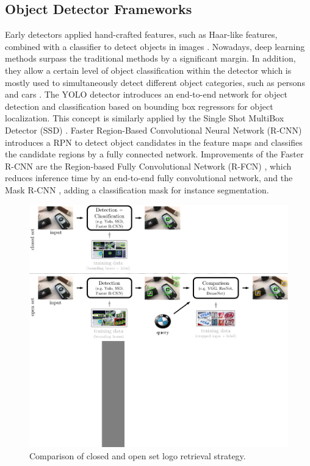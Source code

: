 \documentclass[a4paper,twoside]{article}
\begin{document}
\subsection{Object Detector Frameworks}
Early detectors applied hand-crafted features, such as Haar-like features, combined with a classifier to detect objects in images \cite{viola2004}. 
Nowadays, deep learning methods surpass the traditional methods by a significant margin. In addition, they allow a certain level of object classification within the detector which is mostly used to simultaneously detect different object categories, such as  persons and cars \cite{sermanet2013}. 
The YOLO detector \cite{redmon2015} introduces an end-to-end network for object detection and classification based on bounding box regressors for object localization. This concept is similarly applied by the Single Shot MultiBox Detector (SSD) \cite{liu2016b}. 
Faster Region-Based Convolutional Neural Network (R-CNN) \cite{ren2015} introduces a \ac{RPN} to detect object candidates in the feature maps and classifies the candidate regions by a fully connected network. 
Improvements of the Faster R-CNN are the Region-based Fully Convolutional Network (R-FCN) \cite{jifengdai2016b}, which reduces inference time by an end-to-end fully convolutional network, and the Mask R-CNN \cite{he2017}, adding a classification mask for instance segmentation.
%
\begin{figure}%
\centering%
\includegraphics[width=\linewidth, trim=0cm 6.6cm 0cm 0cm, clip]{img/openset.pdf}%
\caption{Comparison of closed and open set logo retrieval strategy.}%
\label{fig:openClosedSet}
\end{figure}%
\end{document}
